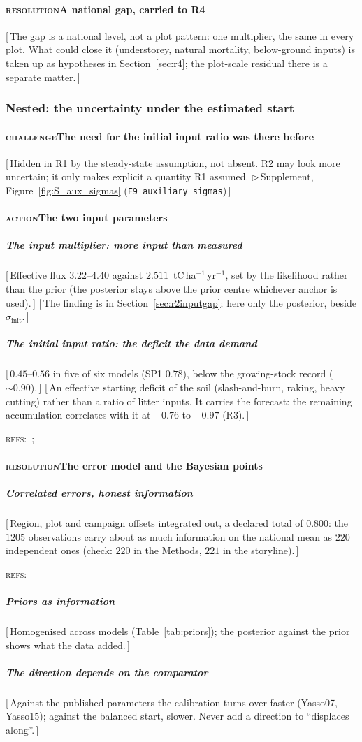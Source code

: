 \documentclass[11pt]{article}
\newcounter{subsubparagraph}[subparagraph]
\newcommand{\beat}[1]{\textcolor{black!45}{\textsc{\small #1}}\enspace}
\newcommand{\gap}[1]{\textcolor{red!70!black}{\small[\,#1\,]}}
\newcommand{\refs}[1]{\par\textcolor{red!70!black}{\footnotesize\textsc{refs:}\ #1}\par}
\newcommand{\suppanchor}[2]{\textcolor{red!70!black}{\small$\triangleright$\,Supplement,
  Figure~\ref{fig:#1} (\texttt{#2})}}
\newcommand{\sinit}{\sigma_{\mathrm{init}}}
\begin{document}
\paragraph{\beat{resolution}A national gap, carried to R4}
\gap{The gap is a national level, not a plot pattern: one multiplier, the same in every plot.
What could close it (understorey, natural mortality, below-ground inputs) is taken up as
hypotheses in Section~\ref{sec:r4}; the plot-scale residual there is a separate matter.}

\subsubsection{Nested: the uncertainty under the estimated start}
\paragraph{\beat{challenge}The need for the initial input ratio was there before}
\gap{Hidden in R1 by the steady-state assumption, not absent. R2 may look more uncertain; it only
makes explicit a quantity R1 assumed.
\suppanchor{S_aux_sigmas}{F9\_auxiliary\_sigmas}}
\paragraph{\beat{action}The two input parameters}
\subparagraph{The input multiplier: more input than measured}
\gap{Effective flux $3.22$--$4.40$ against $2.511$~tC\,ha$^{-1}$\,yr$^{-1}$, set by the likelihood
rather than the prior (the posterior stays above the prior centre whichever anchor is used).}
\gap{The finding is in Section~\ref{sec:r2inputgap}; here only the posterior, beside $\sinit$.}
\subparagraph{The initial input ratio: the deficit the data demand}
\gap{$0.45$--$0.56$ in five of six models (SP1 $0.78$), below the growing-stock record
($\sim0.90$).}
\gap{An effective starting deficit of the soil (slash-and-burn, raking, heavy cutting) rather
than a ratio of litter inputs. It carries the forecast: the remaining accumulation correlates with
it at $-0.76$ to $-0.97$ (R3).}
\refs{\citet{Liski2006}; \citet{Peltoniemi2004}}
\paragraph{\beat{resolution}The error model and the Bayesian points}
\subparagraph{Correlated errors, honest information}
\gap{Region, plot and campaign offsets integrated out, a declared total of $0.800$: the $1205$
observations carry about as much information on the national mean as $220$ independent ones
(check: $220$ in the Methods, $221$ in the storyline).}
\refs{\citet{Oberpriller2021}}
\subparagraph{Priors as information}
\gap{Homogenised across models (Table~\ref{tab:priors}); the posterior against the prior shows
what the data added.}
\subparagraph{The direction depends on the comparator}
\gap{Against the published parameters the calibration turns over faster (Yasso07, Yasso15);
against the balanced start, slower. Never add a direction to ``displaces along''.}
\end{document}
